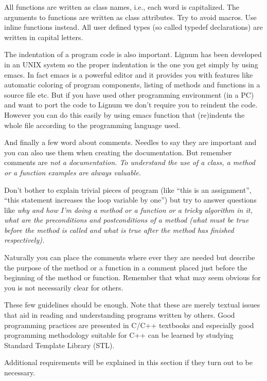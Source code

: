 All   functions are   written as class   names,  i.e.,   each word  is
capitalized.   The    arguments to  functions  are  written   as class
attributes.  Try to  avoid macros.  Use  inline functions instead. All
user  defined types (so   called typedef declarations) are written  in
capital letters.

The indentation of  a program code is  also important. Lignum has been
developed in an  UNIX system so the  proper indentation is the one you
get simply by using emacs.  In fact emacs  is a powerful editor and it
provides   you with features  like     automatic coloring of   program
components, listing  of  methods and  functions in  a source file etc.
But if you have used other programming  environment (in a PC) and want
to port the  code  to Lignum  we  don't  require you to   reindent the
code. However  you can do  this  easily by  using emacs  function that
(re)indents the whole file according to the programming language used.

And  finally  a  few word  about comments.   Needles  to say  they are
important and you  can also use  them when creating the documentation.
But  remember comments are \it  not \rm a documentation. To understand
the  use  of a class,   a method  or  a  function examples  are always
valuable.

Don't  bother to explain trivial pieces  of program (like ``this is an
assignment'',  ``this statement increases the  loop variable by one'')
but try to answer questions like \it why \rm and \it how \rm I'm doing
a method or  a  function or  a tricky  algorithm in  it, what  are the
preconditions and postconditions of a method (what must be true before
the  method is called and  what is true after  the method has finished
respectively).  

Naturally you  can place the comments where  ever they are  needed but
describe the  purpose of the method or  a function in a comment placed
just  before the beginning of  the method  or function.  Remember that
what may seem obvious for you is not necessarily clear for others.

These  few guidelines should  be enough.  Note   that these are merely
textual issues that aid  in reading and understanding programs written
by others. Good programming practices are presented in C/C++ textbooks
and especially good  programming methodology suitable  for C++  can be
learned by studying Standard Template Library (STL).

Additional requirements will be explained in this section if they turn
out to be necessary.
